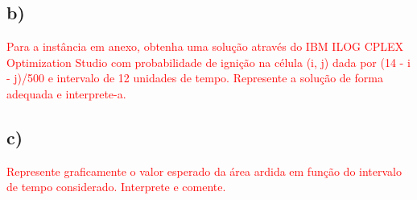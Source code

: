 \documentclass[11pt]{article} %
\begin{document}
\subsection*{b)}
\textcolor{red}{Para a instância em anexo, obtenha uma solução através do IBM ILOG CPLEX
Optimization Studio com probabilidade de ignição na célula (i, j) dada por (14 - i -
j)/500 e intervalo de 12 unidades de tempo. Represente a solução de forma adequada
e interprete-a.}

\subsection*{c)}
\textcolor{red}{Represente graficamente o valor esperado da área ardida em função do intervalo
de tempo considerado. Interprete e comente.}
\end{document}
